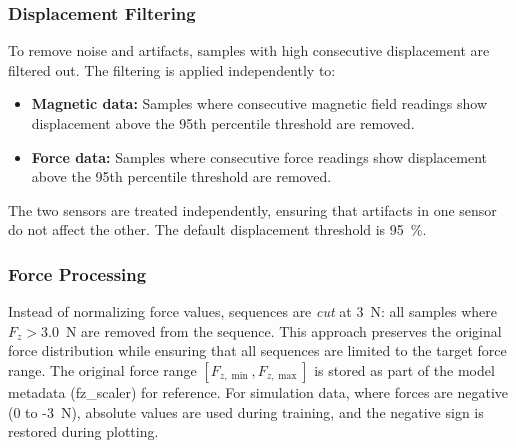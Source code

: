 \documentclass[11pt,a4paper]{article}
\begin{document}
\subsubsection{Displacement Filtering}
To remove noise and artifacts, samples with high consecutive displacement are filtered out. The filtering is applied independently to:
\begin{itemize}[leftmargin=1.5em]
    \item \textbf{Magnetic data:} Samples where consecutive magnetic field readings show displacement above the 95th percentile threshold are removed.
    \item \textbf{Force data:} Samples where consecutive force readings show displacement above the 95th percentile threshold are removed.
\end{itemize}
The two sensors are treated independently, ensuring that artifacts in one sensor do not affect the other. The default displacement threshold is \SI{95}{\percent}.

\subsubsection{Force Processing}
Instead of normalizing force values, sequences are \emph{cut} at 3~N: all samples where \(F_z > 3.0\)~N are removed from the sequence. This approach preserves the original force distribution while ensuring that all sequences are limited to the target force range. The original force range \([F_{z,\min}, F_{z,\max}]\) is stored as part of the model metadata (fz\_scaler) for reference. For simulation data, where forces are negative (0 to -3~N), absolute values are used during training, and the negative sign is restored during plotting.
\end{document}
